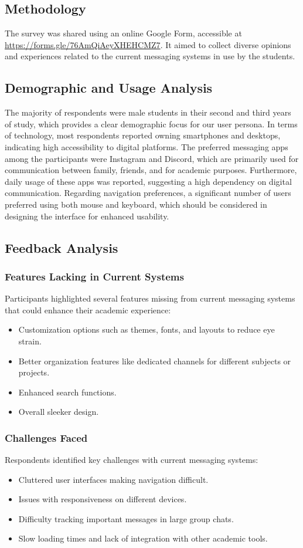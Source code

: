 \documentclass[12pt,a4paper]{article}
\begin{document}
\subsection{Methodology}
The survey was shared using an online Google Form, accessible at \url{https://forms.gle/76AmQiAeyXHEHCMZ7}. It aimed to collect diverse opinions and experiences related to the current messaging systems in use by the students.

\subsection{Demographic and Usage Analysis}
The majority of respondents were male students in their second and third years of study, which provides a clear demographic focus for our user persona. In terms of technology, most respondents reported owning smartphones and desktops, indicating high accessibility to digital platforms. The preferred messaging apps among the participants were Instagram and Discord, which are primarily used for communication between family, friends, and for academic purposes. Furthermore, daily usage of these apps was reported, suggesting a high dependency on digital communication. Regarding navigation preferences, a significant number of users preferred using both mouse and keyboard, which should be considered in designing the interface for enhanced usability.

\subsection{Feedback Analysis}
\subsubsection{Features Lacking in Current Systems}
Participants highlighted several features missing from current messaging systems that could enhance their academic experience:
\begin{itemize}
    \item Customization options such as themes, fonts, and layouts to reduce eye strain.
    \item Better organization features like dedicated channels for different subjects or projects.
    \item Enhanced search functions.
    \item Overall sleeker design.
\end{itemize}

\subsubsection{Challenges Faced}
Respondents identified key challenges with current messaging systems:
\begin{itemize}
    \item Cluttered user interfaces making navigation difficult.
    \item Issues with responsiveness on different devices.
    \item Difficulty tracking important messages in large group chats.
    \item Slow loading times and lack of integration with other academic tools.
\end{itemize}
\end{document}
